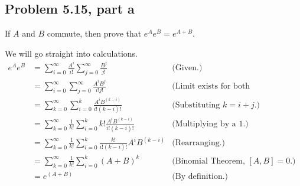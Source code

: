 \subsection{Problem 5.15, part a}
If $A$ and $B$ commute, then prove that $e^{A}e^{B} = e^{A+B}$.
\partbreak
\begin{solution}
    
    We will go straight into calculations. 
    \tightalignbreak
    \begin{align*}
        e^Ae^B &= \sum_{i = 0}^\infty \frac{A^i}{i!} \sum_{j = 0}^\infty \frac{B^j}{j!} &\text{(Given.)}\\
        &= \sum_{i = 0}^\infty\sum_{j = 0}^\infty \frac{A^i B^j}{i! j!}  &\text{(Limit exists for both summations.)}\\
        &= \sum_{k = 0}^\infty \sum_{i = 0}^k \frac{A^i B^{(k - i)}}{i! (k - i)!} &\text{(Substituting $k = i + j$.)}\\
        &= \sum_{k = 0}^\infty \frac{1}{k!}\sum_{i = 0}^k k!\frac{A^i B^{(k - i)}}{i! (k - i)!} &\text{(Multiplying by a 1.)}\\
        &= \sum_{k = 0}^\infty \frac{1}{k!}\sum_{i = 0}^k \frac{k!}{i! (k - i)!}A^i B^{(k - i)} &\text{(Rearranging.)}\\
        &= \sum_{k = 0}^\infty \frac{1}{k!}\sum_{i = 0}^k (A + B)^k &\text{(Binomial Theorem, $[A, B] = 0$.)}\\
        &= e^{(A + B)} &\text{(By definition.)}
    \end{align*}
    \vspace{-6mm}\alignbreak
\end{solution}


\newpage
